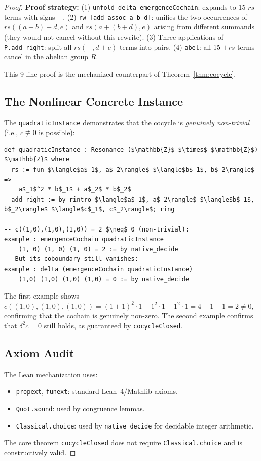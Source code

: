 \documentclass[acmsmall,sigplan,anonymous,review,screen]{acmart}
\theoremstyle{plain}
\theoremstyle{definition}
\newcommand{\rs}{\mathit{rs}}
\newcommand{\lean}[1]{\texttt{#1}}
\begin{document}
\begin{proof}
\textbf{Proof strategy:}
(1) \lean{unfold delta emergenceCochain}: expands to 15 $\rs$-terms with
signs $\pm$.
(2) \lean{rw [add\_assoc a b d]}: unifies the two occurrences of
$\rs((a+b)+d, e)$ and $\rs(a+(b+d), e)$ arising from different summands
(they would not cancel without this rewrite).
(3) Three applications of \lean{P.add\_right}: split all $\rs(-, d+e)$
terms into pairs.
(4) \lean{abel}: all 15 $\pm\rs$-terms cancel in the abelian group $R$.

This 9-line proof is the mechanized counterpart of
Theorem~\ref{thm:cocycle}.

\subsection{The Nonlinear Concrete Instance}
\label{sec:lean:instance}

The \lean{quadraticInstance} demonstrates that the cocycle is
\emph{genuinely non-trivial} (i.e., $c \not\equiv 0$ is possible):

\begin{lstlisting}[frame=single]
def quadraticInstance : Resonance ($\mathbb{Z}$ $\times$ $\mathbb{Z}$) $\mathbb{Z}$ where
  rs := fun $\langle$a$_1$, a$_2\rangle$ $\langle$b$_1$, b$_2\rangle$ =>
    a$_1$^2 * b$_1$ + a$_2$ * b$_2$
  add_right := by rintro $\langle$a$_1$, a$_2\rangle$ $\langle$b$_1$, b$_2\rangle$ $\langle$c$_1$, c$_2\rangle$; ring

-- c((1,0),(1,0),(1,0)) = 2 $\neq$ 0 (non-trivial):
example : emergenceCochain quadraticInstance
    (1, 0) (1, 0) (1, 0) = 2 := by native_decide
-- But its coboundary still vanishes:
example : delta (emergenceCochain quadraticInstance)
    (1,0) (1,0) (1,0) (1,0) = 0 := by native_decide
\end{lstlisting}

The first example shows $c((1,0),(1,0),(1,0)) = (1+1)^2 \cdot 1 - 1^2 \cdot 1 - 1^2 \cdot 1 = 4 - 1 - 1 = 2 \neq 0$,
confirming that the cochain is genuinely non-zero.  The second example
confirms that $\delta^2 c = 0$ still holds, as guaranteed by
\lean{cocycleClosed}.

\subsection{Axiom Audit}
\label{sec:lean:axioms}

The Lean mechanization uses:
\begin{itemize}[itemsep=2pt]
  \item \lean{propext}, \lean{funext}: standard Lean~4/Mathlib axioms.
  \item \lean{Quot.sound}: used by congruence lemmas.
  \item \lean{Classical.choice}: used by \lean{native\_decide} for
    decidable integer arithmetic.
\end{itemize}
The core theorem \lean{cocycleClosed} does not require \lean{Classical.choice}
and is constructively valid.


\end{proof}
\end{document}

